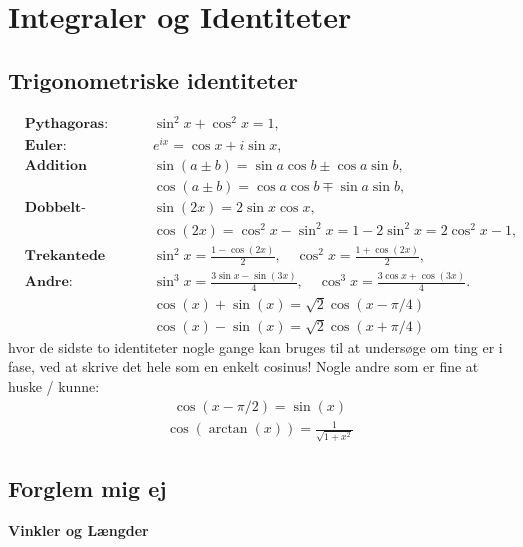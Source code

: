 \documentclass[a4paper]{article}
\begin{document}
    
    
    \newpage
    \section{Integraler og Identiteter}
    \subsection{Trigonometriske identiteter}
    \begin{align*}
        &\textbf{Pythagoras:} 
        && \sin^2 x + \cos^2 x = 1, \\[6pt]
        &\textbf{Euler:}
        && e^{i x} = \cos x + i \sin x, \\[6pt]
        &\textbf{Addition (sum) formler:} 
        && \sin(a \pm b) = \sin a \cos b \pm \cos a \sin b, \\
        &&& \cos(a \pm b) = \cos a \cos b \mp \sin a \sin b, \\[6pt]
        &\textbf{Dobbelt-vinkler:}
        && \sin(2x) = 2 \sin x \cos x, \\
        &&& \cos(2x) = \cos^2 x - \sin^2 x = 1 - 2 \sin^2 x = 2 \cos^2 x - 1, \\[6pt]
        &\textbf{Trekantede kombinationer:}
        && \boxed{\sin^2 x = \frac{1 - \cos(2x)}{2}, \quad 
        \cos^2 x = \frac{1 + \cos(2x)}{2}}, \\[6pt]
        &\textbf{Andre:}
        && \sin^3 x = \frac{3 \sin x - \sin(3x)}{4}, \quad
        \cos^3 x = \frac{3 \cos x + \cos(3x)}{4}.\\
        &&& \boxed{\cos (x) + \sin (x) = \sqrt{2} \cos \left( x - \pi/ 4 \right)} \\
        &&& \cos (x) - \sin (x) = \sqrt{2} \cos \left( x + \pi /4 \right)  
    \end{align*}
    hvor de sidste to identiteter nogle gange kan bruges til at undersøge om ting er i fase, ved at skrive det hele som en enkelt cosinus! Nogle andre som er fine at huske / kunne:
    \begin{align*}
        \cos (x - \pi  /2 ) = \sin (x)
    \end{align*}
    \begin{align*}
        \cos (\arctan(x)) = \frac{1}{\sqrt{1 + x^{2} }}
    \end{align*}

    \subsection{Forglem mig ej}
    \textbf{Vinkler og Længder}
    
\end{document}
